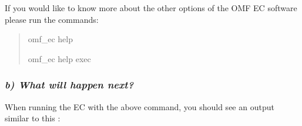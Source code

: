 \documentclass[letterpaper,10pt,english]{sphinxmanual}
\begin{document}
If you would like to know more about the other options of the OMF EC software please run the commands:
\begin{quote}

\begin{DUlineblock}{0em}
\item[] omf\_ec help
\item[] omf\_ec help exec
\end{DUlineblock}
\end{quote}


\subsubsection{\emph{b) What will happen next?}}
\label{wireless_example:b-what-will-happen-next}
\begin{DUlineblock}{0em}
\item[] When running the EC with the above command, you should see an output similar to this :
\end{DUlineblock}
\end{document}
